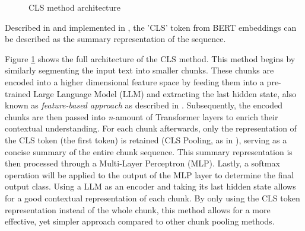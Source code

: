 \begin{figure}[htbp]
    \caption{CLS method architecture}
    \label{fig:cls_method}
\end{figure}

Described in \cite{devlin-2019-bert} and implemented in \cite{su-2021-classifying,su-2021-classifying}, the 'CLS' token from BERT embeddings can be described as the summary representation of the sequence.

Figure \ref{fig:cls_method} shows the full architecture of the CLS method. This method begins by similarly segmenting the input text into smaller chunks. These chunks are encoded into a higher dimensional feature space by feeding them into a pre-trained Large Language Model (LLM) and extracting the last hidden state, also known as \textit{feature-based approach} as described in \cite{sun-2020-fine-tune}. Subsequently, the encoded chunks are then passed into \textit{n}-amount of Transformer layers to enrich their contextual understanding. For each chunk afterwards, only the representation of the CLS token (the first token) is retained (CLS Pooling, as in \cite{su-2021-classifying}), serving as a concise summary of the entire chunk sequence. This summary representation is then processed through a Multi-Layer Perceptron (MLP). Lastly, a softmax operation will be applied to the output of the MLP layer to determine the final output class. Using a LLM as an encoder and taking its last hidden state allows for a good contextual representation of each chunk. By only using the CLS token representation instead of the whole chunk, this method allows for a more effective, yet simpler approach compared to other chunk pooling methods.

